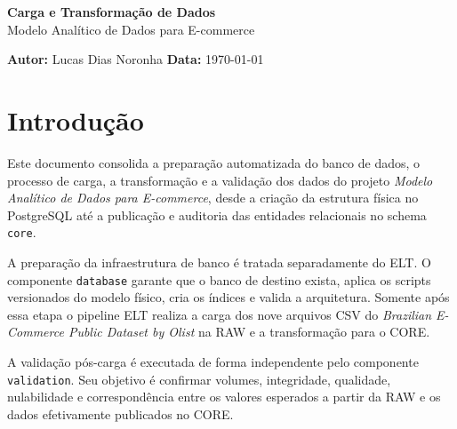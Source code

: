\documentclass[12pt,a4paper]{article}
\newcommand{\projeto}{Modelo Analítico de Dados para E-commerce}
\newcommand{\autor}{Lucas Dias Noronha}
\newcommand{\dataDocumento}{\today}
\begin{document}
	
	\thispagestyle{empty}
	
	\vspace*{\fill}
	
	\begin{center}
		{\Huge
			\textcolor{AzulCorporativo}{
				\textbf{Carga e Transformação de Dados}
			}
		}\\[0.5cm]
		
		{\Large
			\textcolor{AzulPetroleo}{
				\projeto
			}
		}\\[0.8cm]
	\end{center}
	
	\vspace*{\fill}
	
	\noindent
	\textbf{\textcolor{AzulCorporativo}{Autor:}} \autor
	\hfill
	\textbf{\textcolor{AzulCorporativo}{Data:}} \dataDocumento
	
	\newpage
	
	\setcounter{tocdepth}{2}
	\tableofcontents
	
	\newpage
	
	\section{Introdução}
	
	Este documento consolida a preparação automatizada do banco de dados, o processo
	de carga, a transformação e a validação dos dados do projeto
	\textit{\projeto}, desde a criação da estrutura física no PostgreSQL até a
	publicação e auditoria das entidades relacionais no schema \texttt{core}.
	
	A preparação da infraestrutura de banco é tratada separadamente do ELT. O
	componente \texttt{database} garante que o banco de destino exista, aplica os
	scripts versionados do modelo físico, cria os índices e valida a arquitetura.
	Somente após essa etapa o pipeline ELT realiza a carga dos nove arquivos CSV do
	\textit{Brazilian E-Commerce Public Dataset by Olist} na RAW e a transformação
	para o CORE.
	
	A validação pós-carga é executada de forma independente pelo componente
	\texttt{validation}. Seu objetivo é confirmar volumes, integridade, qualidade,
	nulabilidade e correspondência entre os valores esperados a partir da RAW e os
	dados efetivamente publicados no CORE.
	
\end{document}
